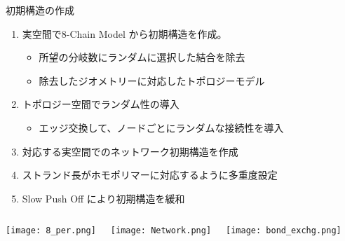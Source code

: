 \begin{columns}[totalwidth=.85\linewidth]
    \column{\textwidth}
        \begin{itembox}[l]{初期構造の作成\cite{sasaki}}
            \begin{enumerate}
                \item \alert{実空間}で8-Chain Model から初期構造を作成。
                    \begin{itemize}
                        \normalsize
                        \item 所望の分岐数に\alert{ランダム}に選択した\alert{結合を除去}
                        \item 除去したジオメトリーに対応した\alert{トポロジーモデル}
                    \end{itemize}
                \item トポロジー空間でランダム性の導入
                    \begin{itemize}
                        \normalsize
                        \item \alert{エッジ交換}して、ノードごとにランダムな接続性を導入
                    \end{itemize}	
                \item 対応する\alert{実空間でのネットワーク初期構造}を作成
                \item \alert{ストランド長がホモポリマーに対応}するように多重度設定
                \item \alert{Slow Push Off\cite{auhl} により初期構造を緩和}
            \end{enumerate}

            \vspace{-1mm}
            \begin{columns}[T, onlytextwidth]
                    \texttt{[image: 8\_per.png]}
                    \vspace{-5mm}
                    \begin{center}
                        \texttt{[image: Network.png]}
                    \end{center}
                    \texttt{[image: bond\_exchg.png]}
            \end{columns}
        \end{itembox}


\end{columns}
